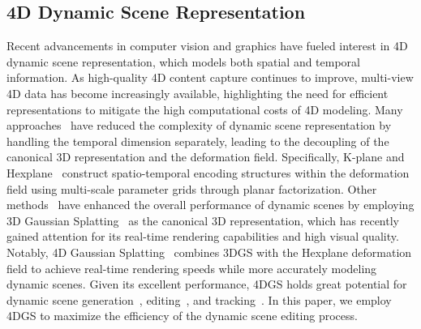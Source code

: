 \subsection{4D Dynamic Scene Representation}
Recent advancements in computer vision and graphics have fueled interest in 4D dynamic scene representation, which models both spatial and temporal information. As high-quality 4D content capture continues to improve, multi-view 4D data has become increasingly available, highlighting the need for efficient representations to mitigate the high computational costs of 4D modeling. Many approaches~\cite{ref_22_nerfplayer, ref_27_tensor4d, ref_45_dnerf, ref_46_neuralradianceflow, ref_47_devrf, ref_48_nerfies, ref_49_nonrigid} have reduced the complexity of dynamic scene representation by handling the temporal dimension separately, leading to the decoupling of the canonical 3D representation and the deformation field. Specifically, K-plane and Hexplane~\cite{ref_15_kplanes,ref_16_hexplane} construct spatio-temporal encoding structures within the deformation field using multi-scale parameter grids through planar factorization. Other methods~\cite{ref_11_spacetimegs,ref_12_iclr24,ref_13_gaufre, ref_14_4drotergs} have enhanced the overall performance of dynamic scenes by employing 3D Gaussian Splatting~\cite{ref_8_gs} as the canonical 3D representation, which has recently gained attention for its real-time rendering capabilities and high visual quality. Notably, 4D Gaussian Splatting~\cite{ref_10_4dgs} combines 3DGS with the Hexplane deformation field to achieve real-time rendering speeds while more accurately modeling dynamic scenes. Given its excellent performance, 4DGS holds great potential for dynamic scene generation~\cite{ref_17_dreamgaussian4d, ref_19_aligngs, ref_25_4dfy}, editing~\cite{ref_9_i4d24d, ref_33_control4d}, and tracking~\cite{ref_50_dynamic3dgs, ref_51_motionaware}. In this paper, we employ 4DGS to maximize the efficiency of the dynamic scene editing process.



